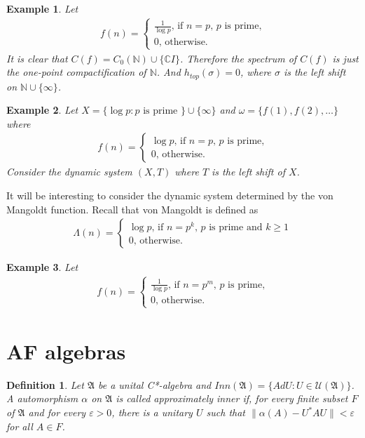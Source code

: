 \documentclass[a4paper,10pt]{amsart}
\newtheorem{example}{Example}[section]
\newtheorem{definition}{Definition}[section]
\newcommand{\AAA}{\mathfrak A}
\newcommand{\C}{\mathbb C} %
\newcommand{\N}{\mathbb N} %
\begin{document}
\begin{example}
    Let
    \begin{align*}
     f(n) = \begin{cases}
        \frac{1}{\log p}  \mbox{, if $n=p$, $p$ is prime,}\\
        0  \mbox{, otherwise}.
    \end{cases} 
    \end{align*}
    It is clear that $C(f) = C_{0}(\N) \cup \{\C I\}$.
    Therefore the spectrum of $C(f)$ is just the one-point compactification
    of $\N$. And $h_{top}(\sigma) = 0$, where $\sigma$ is the left
    shift on $\N \cup \{\infty\}$.
\end{example}

\begin{example}
    Let $X = \{\log p : p \mbox{ is prime } \} \cup \{\infty \}$ and
    $\omega = \{f(1), f(2), \ldots \}$ where
    \begin{align*}
     f(n) = \begin{cases}
        \log p  \mbox{, if $n=p$, $p$ is prime,}\\
        0  \mbox{, otherwise}.
    \end{cases}
    \end{align*}
    Consider the dynamic system $(X, T)$ where $T$ is the left shift of $X$.
\end{example}


It will be interesting to consider the dynamic system determined 
by the von Mangoldt function. Recall that von Mangoldt is defined as
\begin{align*}
    \varLambda(n) = \begin{cases}
        \log p  \mbox{, if $n=p^{k}$, $p$ is prime and $k \geq 1$}\\
        0  \mbox{, otherwise}.
    \end{cases}
\end{align*}



\begin{example}
    Let
    \begin{align*}
     f(n) = \begin{cases}
        \frac{1}{\log p}  \mbox{, if $n=p^{m}$, $p$ is prime,}\\
        0  \mbox{, otherwise}.
    \end{cases} 
    \end{align*}
\end{example}

\section{AF algebras}
\begin{definition}
    Let $\AAA$ be a unital C*-algebra and 
    $Inn(\AAA) = \{ Ad U : U \in \mathcal{U}(\AAA)\}$.
    A automorphism $\alpha$ on $\AAA$ is called approximately 
    inner if, for every finite subset $F$ of $\AAA$ and 
    for every $\varepsilon > 0$, there is a unitary $U$ such that
    $\| \alpha(A) - U^{*}AU \| < \varepsilon$ for all $A \in F$.
\end{definition}
\end{document}
